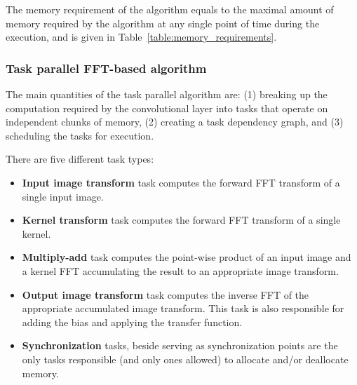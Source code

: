 \documentclass[conference]{./IEEEtran/IEEEtran}
\begin{document}
  The memory requirement of the algorithm equals to the maximal amount
  of memory required by the algorithm at any single point of time
  during the execution, and is given in
  Table~\ref{table:memory_requirements}.

\subsubsection{Task parallel FFT-based algorithm}

  The main quantities of the task parallel algorithm are: (1) breaking
  up the computation required by the convolutional layer into tasks
  that operate on independent chunks of memory, (2) creating a task
  dependency graph, and (3) scheduling the tasks for execution.

  There are five different task types:

  {\color{zblack}}

  \begin{itemize}
    \item {\color{zred}\bf Input image transform} task computes the
      forward FFT transform of a single input image.
    \item {\color{zblue}\bf Kernel transform} task computes the forward
      FFT transform of a single kernel.
    \item {\color{zgreen}\bf Multiply-add} task computes the
      point-wise product of an input image and a kernel FFT
      accumulating the result to an appropriate image transform.
    \item {\color{zpurple}\bf Output image transform} task computes
      the inverse FFT of the appropriate accumulated image transform.
      This task is also responsible for adding the bias and applying
      the transfer function.
    \item {\color{zyellow}\bf Synchronization} tasks, beside serving
      as synchronization points are the only tasks responsible (and
      only ones allowed) to allocate and/or deallocate memory.
  \end{itemize}

  {\color{zblack}}
\end{document}
